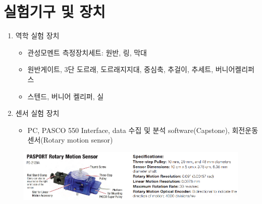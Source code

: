 \documentclass[12pt,a4paper]{article}
\begin{document}
\section{실험기구 및 장치}
\begin{enumerate}
    \item 역학 실험 장치
        \begin{itemize}
            \item 관성모멘트 측정장치세트: 원반, 링, 막대
            \item 원반게이트, 3단 도르래, 도르래지지대, 중심축, 추걸이, 추세트,
                버니어켈리퍼스
            \item 스텐드, 버니어 켈리퍼, 실
        \end{itemize}
    \item 센서 실험 장치
        \begin{itemize}
            \item PC, PASCO 550 Interface, data 수집 및 분석 software(Capstone),
                회전운동 센서(Rotary motion sensor)
        \end{itemize}
\end{enumerate}
\begin{figure}[h!]
    \centering
    \includegraphics[width=15cm]{2024-05-26 231136.png}
\end{figure}
\end{document}
